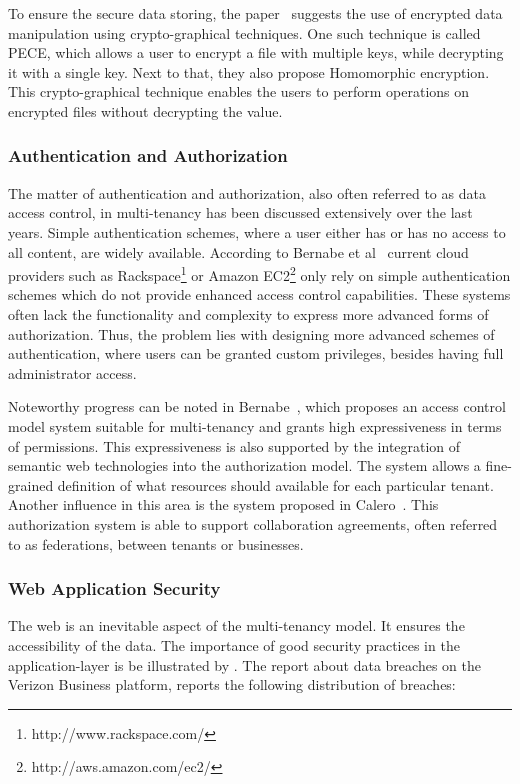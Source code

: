 To ensure the secure data storing, the paper~\cite{Takahashi2012Security} suggests the use of encrypted data manipulation using crypto-graphical techniques. 
One such technique is called \acf{PECE}, which allows a user to encrypt a file with multiple keys, while decrypting it with a single key. 
Next to that, they also propose Homomorphic encryption. 
This crypto-graphical technique enables the users to perform operations on encrypted files without decrypting the value.

\subsubsection{Authentication and Authorization}
The matter of authentication and authorization, also often referred to as data access control, in multi-tenancy has been discussed extensively over the last years. 
Simple authentication schemes, where a user either has or has no access to all content, are widely available. According to Bernabe et al~\cite{Bernabe2012Auth} current cloud providers such as Rackspace\footnote{http://www.rackspace.com/} or Amazon EC2\footnote{http://aws.amazon.com/ec2/} only rely on simple authentication schemes which do not provide enhanced access control capabilities. 
These systems often lack the functionality and complexity to express more advanced forms of authorization. 
Thus, the problem lies with designing more advanced schemes of authentication, where users can be granted custom privileges, besides having full administrator access.

Noteworthy progress can be noted in Bernabe~\cite{Bernabe2012Auth}, which proposes an access control model system suitable for multi-tenancy and grants high expressiveness in terms of permissions. 
This expressiveness is also supported by the integration of semantic web technologies into the authorization model. 
The system allows a fine-grained definition of what resources should available for each particular tenant. 
Another influence in this area is the system proposed in Calero~\cite{Calero2010Auth}. 
This authorization system is able to support collaboration agreements, often referred to as federations, between tenants or businesses.

\subsubsection{Web Application Security}
The web is an inevitable aspect of the multi-tenancy model. 
It ensures the accessibility of the data. 
The importance of good security practices in the application-layer is be illustrated by . 
The report about data breaches on the Verizon Business platform, reports the following distribution of breaches:

